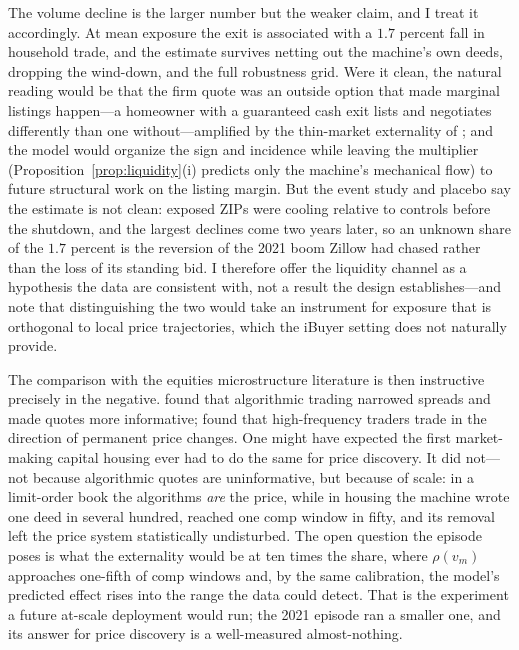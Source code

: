 \documentclass[12pt, letterpaper]{article}
\theoremstyle{remark}
\begin{document}
The volume decline is the larger number but the weaker claim, and I treat it accordingly. At mean exposure the exit is associated with a $1.7$ percent fall in household trade, and the estimate survives netting out the machine's own deeds, dropping the wind-down, and the full robustness grid. Were it clean, the natural reading would be that the firm quote was an outside option that made marginal listings happen---a homeowner with a guaranteed cash exit lists and negotiates differently than one without---amplified by the thin-market externality of \citet{ngai2014hot}; and the model would organize the sign and incidence while leaving the multiplier (Proposition~\ref{prop:liquidity}(i) predicts only the machine's mechanical flow) to future structural work on the listing margin. But the event study and placebo say the estimate is not clean: exposed ZIPs were cooling relative to controls before the shutdown, and the largest declines come two years later, so an unknown share of the $1.7$ percent is the reversion of the 2021 boom Zillow had chased rather than the loss of its standing bid. I therefore offer the liquidity channel as a hypothesis the data are consistent with, not a result the design establishes---and note that distinguishing the two would take an instrument for exposure that is orthogonal to local price trajectories, which the iBuyer setting does not naturally provide.

The comparison with the equities microstructure literature is then instructive precisely in the negative. \citet{hendershott2011algorithmic} found that algorithmic trading narrowed spreads and made quotes more informative; \citet{brogaard2014hft} found that high-frequency traders trade in the direction of permanent price changes. One might have expected the first market-making capital housing ever had to do the same for price discovery. It did not---not because algorithmic quotes are uninformative, but because of scale: in a limit-order book the algorithms \emph{are} the price, while in housing the machine wrote one deed in several hundred, reached one comp window in fifty, and its removal left the price system statistically undisturbed. The open question the episode poses is what the externality would be at ten times the share, where $\rho(v_m)$ approaches one-fifth of comp windows and, by the same calibration, the model's predicted effect rises into the range the data could detect. That is the experiment a future at-scale deployment would run; the 2021 episode ran a smaller one, and its answer for price discovery is a well-measured almost-nothing.
\end{document}

